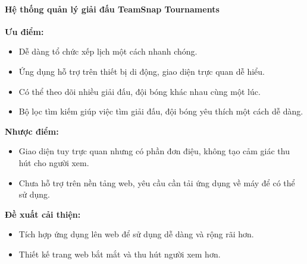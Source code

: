 \paragraph{Hệ thống quản lý giải đấu TeamSnap Tournaments}\mbox{}

\noindent
\textbf{Ưu điểm:}
\vspace{-0.5em}
\begin{itemize}[leftmargin=1.5cm, label={--}]
  \item Dễ dàng tổ chức xếp lịch một cách nhanh chóng.
  \item Ứng dụng hỗ trợ trên thiết bị di động, giao diện trực quan dễ hiểu.
  \item Có thể theo dõi nhiều giải đấu, đội bóng khác nhau cùng một lúc.
  \item Bộ lọc tìm kiếm giúp việc tìm giải đấu, đội bóng yêu thích một cách dễ dàng.

\end{itemize}

\noindent
\textbf{Nhược điểm:}
\vspace{-0.5em}
\begin{itemize}[leftmargin=1.5cm, label={--}]
  \item Giao diện tuy trực quan nhưng có phần đơn điệu, không tạo cảm giác thu hút cho người xem.
  \item Chưa hỗ trợ trên nền tảng web, yêu cầu cần tải ứng dụng về máy để có thể sử dụng.
\end{itemize}

\noindent
\textbf{Đề xuất cải thiện:}
\vspace{-0.5em}
\begin{itemize} [leftmargin=1.5cm, label={--}]
  \item Tích hợp ứng dụng lên web để sử dụng dễ dàng và rộng rãi hơn.
  \item Thiết kế trang web bắt mắt và thu hút người xem hơn.
\end{itemize}
